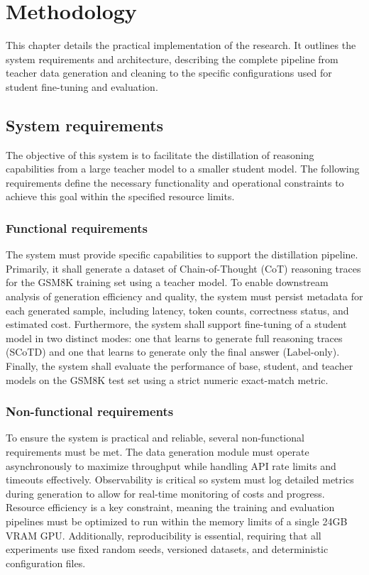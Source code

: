 \chapter{Methodology}

This chapter details the practical implementation of the research. It outlines the system requirements and architecture, describing the complete pipeline from teacher data generation and cleaning to the specific configurations used for student fine-tuning and evaluation.

\section{System requirements}
The objective of this system is to facilitate the distillation of reasoning capabilities from a large teacher model to a smaller student model. The following requirements define the necessary functionality and operational constraints to achieve this goal within the specified resource limits.

\subsection{Functional requirements}
The system must provide specific capabilities to support the distillation pipeline. Primarily, it shall generate a dataset of Chain-of-Thought (CoT) reasoning traces for the GSM8K training set using a teacher model. To enable downstream analysis of generation efficiency and quality, the system must persist metadata for each generated sample, including latency, token counts, correctness status, and estimated cost. Furthermore, the system shall support fine-tuning of a student model in two distinct modes: one that learns to generate full reasoning traces (SCoTD) and one that learns to generate only the final answer (Label-only). Finally, the system shall evaluate the performance of base, student, and teacher models on the GSM8K test set using a strict numeric exact-match metric.

\subsection{Non-functional requirements}
To ensure the system is practical and reliable, several non-functional requirements must be met. The data generation module must operate asynchronously to maximize throughput while handling API rate limits and timeouts effectively. Observability is critical so system must log detailed metrics during generation to allow for real-time monitoring of costs and progress. Resource efficiency is a key constraint, meaning the training and evaluation pipelines must be optimized to run within the memory limits of a single 24GB VRAM GPU. Additionally, reproducibility is essential, requiring that all experiments use fixed random seeds, versioned datasets, and deterministic configuration files.

